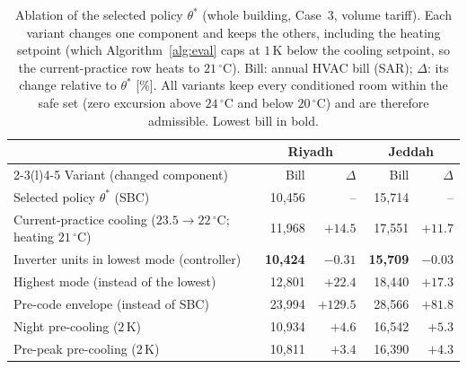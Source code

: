 \documentclass[10pt,a4paper,twocolumn]{article}
\theoremstyle{definition}
\begin{document}
\begin{table}[t]
\centering\footnotesize\setlength{\tabcolsep}{3pt}
\caption{Ablation of the selected policy $\theta^\ast$ (whole building, Case~3, volume tariff). Each variant changes one component and keeps the others, including the heating setpoint (which Algorithm~\ref{alg:eval} caps at $1\,$K below the cooling setpoint, so the current-practice row heats to $21\,^{\circ}$C). Bill: annual HVAC bill (SAR); $\Delta$: its change relative to $\theta^\ast$ [\%]. All variants keep every conditioned room within the safe set (zero excursion above $24\,^{\circ}$C and below $20\,^{\circ}$C) and are therefore admissible. Lowest bill in bold.}
\label{tab:ablation}
\begin{tabularx}{\linewidth}{@{}X r r r r@{}}
\toprule
 & \multicolumn{2}{c}{Riyadh} & \multicolumn{2}{c}{Jeddah} \\
\cmidrule(lr){2-3}\cmidrule(l){4-5}
Variant (changed component) & Bill & $\Delta$ & Bill & $\Delta$ \\
\midrule
Selected policy $\theta^\ast$ (SBC) & 10{,}456 & -- & 15{,}714 & -- \\
\midrule
Current-practice cooling ($23.5\to22\,^{\circ}$C; heating $21\,^{\circ}$C) & 11{,}968 & $+14.5$ & 17{,}551 & $+11.7$ \\
Inverter units in lowest mode (controller) & \textbf{10{,}424} & $-0.31$ & \textbf{15{,}709} & $-0.03$ \\
Highest mode (instead of the lowest) & 12{,}801 & $+22.4$ & 18{,}440 & $+17.3$ \\
Pre-code envelope (instead of SBC) & 23{,}994 & $+129.5$ & 28{,}566 & $+81.8$ \\
Night pre-cooling ($2\,$K) & 10{,}934 & $+4.6$ & 16{,}542 & $+5.3$ \\
Pre-peak pre-cooling ($2\,$K) & 10{,}811 & $+3.4$ & 16{,}390 & $+4.3$ \\
\bottomrule
\end{tabularx}
\end{table}
\end{document}

